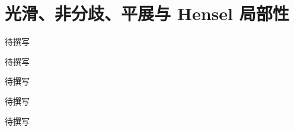 
% 
% 

\chapter{光滑、非分歧、平展与 Hensel 局部性}
\label{g5:ch:15}

\begin{chapterabstract}
待撰写
\end{chapterabstract}

\begin{learninggoals}
待撰写
\end{learninggoals}

待撰写







\begin{chaptersummary}
待撰写
\end{chaptersummary}

\BookExercises
待撰写
